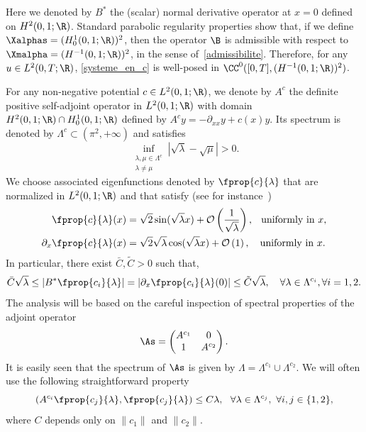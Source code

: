 Here we denoted by $B^*$ the (scalar) normal derivative operator at $x=0$ defined on $H^2(0,1 ; \R)$. Standard parabolic regularity properties show that, if we define $\Xalphas=(H^1_0(0,1 ; \R))^2$, then the operator $\B$ is admissible with respect to\linebreak$\Xmalpha=(H^{-1}(0,1;\R))^2$, in the sense of~\eqref{admissibilite}. Therefore, for any $u\in L^2(0,T;\R)$, \eqref{systeme_en_c} is well-posed in $\CC^0([0,T],(H^{-1}(0,1 ; \R))^2)$.


For any non-negative potential $c\in L^2(0,1 ; \R)$, we denote by $A^c$ the definite positive self-adjoint operator in $L^2(0,1 ; \R)$ with domain $H^2(0,1 ; \R)\cap H^1_0(0,1 ; \R)$ defined by $A^c y=-\partial_{xx} y + c(x) y$. Its spectrum is denoted by $\Lambda^c\subset (\pi^2,+\infty)$ and satisfies
\begin{equation}\label{Asymptotique_Lambda_new}
\inf_{\substack{\lambda,\mu \in \Lambda^c\\ \lambda\neq\mu}} \left|\sqrt{\lambda}-\sqrt{\mu}\right| > 0.
\end{equation}
We choose associated eigenfunctions denoted by $\fprop{c}{\lambda}$ that are normalized in $L^2(0,1 ; \R)$ and that satisfy (see for instance~\cite[Theorem~4.11]{KirschBook})
\begin{align}
\fprop{c}{\lambda}(x) &= \sqrt{2}\sin(\sqrt{\lambda}x) + \mathcal{O}\left(\frac{1}{\sqrt{\lambda}} \right), \;\;\: \text{uniformly in }x,\label{Asymptotique_varphi_new}
\\
\partial_x \fprop{c}{\lambda}(x) &= \sqrt{2}\sqrt{\lambda} \cos(\sqrt{\lambda}x) + \mathcal{O}\left(1 \right), \quad \text{uniformly in }x.\label{Asymptotique_varphi'_new}
\end{align}
In particular, there exist $\bar{C},\tilde{C}>0$ such that,
\begin{equation}\label{observation_Ac}
\bar{C}\sqrt{\lambda} \leq \left|B^* \fprop{c_i}{\lambda}\right| = \left|\partial_x \fprop{c_i}{\lambda}(0)\right|\leq \tilde{C} \sqrt{\lambda}, \quad \forall \lambda\in \Lambda^{c_i}, \forall i=1,2.
\end{equation}
The analysis will be based on the careful inspection of spectral properties of the adjoint operator
\[
\As=
\begin{pmatrix}
A^{c_1}&0
\\
1 & A^{c_2}
\end{pmatrix}.
\]
It is easily seen that the spectrum of $\As$ is given by $\Lambda=\Lambda^{c_1}\cup \Lambda^{c_2}$. We will often use the following straightforward property
\begin{equation}\label{borne_H1_fprop}
(A^{c_i}\fprop{c_j}{\lambda},\fprop{c_j}{\lambda}) \leq C \lambda, \ \ \forall \lambda\in \Lambda^{c_j}, \ \forall i,j\in \{1,2\},
\end{equation}
where $C$ depends only on $\|c_1\|$ and $\|c_2\|$.

